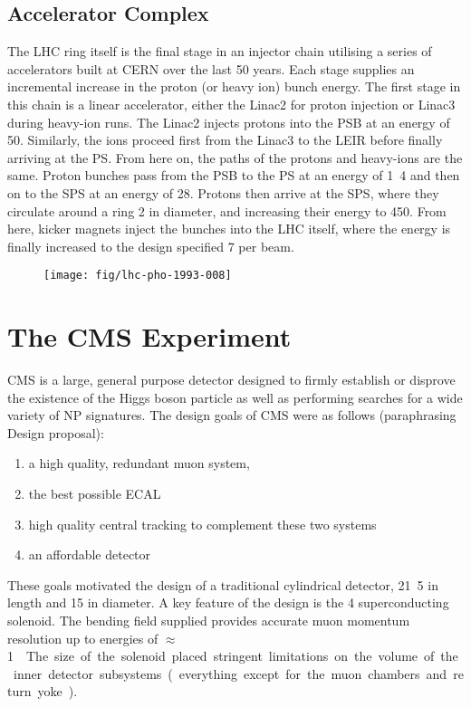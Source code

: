 \subsection{Accelerator Complex}
The \ac{LHC} ring itself is the final stage in an injector chain utilising a
series of accelerators built at CERN over the last 50 years. Each stage supplies
an incremental increase in the proton (or heavy ion) bunch energy. The first
stage in this chain is a linear accelerator, either the Linac2 for proton
injection or Linac3 during heavy-ion runs. The Linac2 injects protons into the
\ac{PSB} at an energy of \unit{50}{\mega\electronvolt}. Similarly, the ions
proceed first from the Linac3 to the \ac{LEIR} before finally arriving at the
\ac{PS}. From here on, the paths of the protons and heavy-ions are the
same. Proton bunches pass from the \ac{PSB} to the \ac{PS} at an energy of
\unit{1.4}{\giga\electronvolt} and then on to the \ac{SPS} at an energy of
\unit{28}{\giga\electronvolt}. Protons then arrive at the \ac{SPS}, where they
circulate around a ring \unit{2}{\kilo\metre} in diameter, and increasing their
energy to \unit{450}{\giga\electronvolt}. From here, kicker magnets inject the
bunches into the \ac{LHC} itself, where the energy is finally increased to the
design specified \unit{7}{\TeV} per beam.
\begin{figure}
\texttt{[image: fig/lhc-pho-1993-008]}
\end{figure}



\section{The \acl{CMS} Experiment}
\label{sec:cms}
\ac{CMS} is a large, general purpose detector\cite{cms_jinst} designed to firmly establish or
disprove the existence of the Higgs boson particle as well as performing
searches for a wide variety of \ac{NP} signatures. The design goals of CMS were
as follows (paraphrasing Design proposal):
\begin{enumerate}
\item a high quality, redundant muon system,
\item the best possible \ac{ECAL}
\item high quality central tracking to complement these two systems
\item an affordable detector
\end{enumerate}

These goals motivated the design of a traditional cylindrical detector,
\unit{21.5}{\metre} in length and \unit{15}{\metre} in diameter. A key feature
of the design is the \unit{4}{\tesla} superconducting solenoid. The bending
field supplied provides accurate muon momentum resolution up to energies of
\unit{$\approx$ 1}{\TeV}. The size of the solenoid placed stringent
limitations on the volume of the inner detector subsystems (everything except
for the muon chambers and return yoke).

